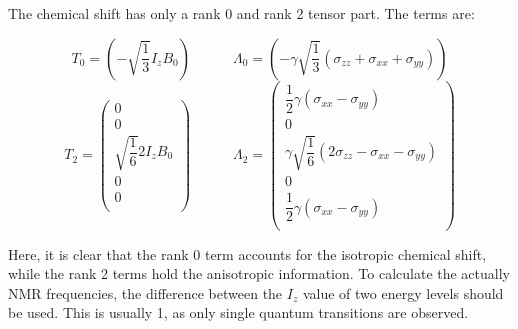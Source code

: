 \documentclass[11pt,a4paper]{article}
\begin{document}
The chemical shift has only a rank 0 and rank 2 tensor part. The terms are:

\begin{equation}
  T_{0} = \left( - \sqrt{\frac{1}{3}} I_z B_0 \right)
  \quad\quad\quad
\Lambda_0 = \left( - \gamma \sqrt{\frac{1}{3}} (\sigma_{zz} + \sigma_{xx} + \sigma_{yy}) \right)
\end{equation}
\begin{equation}
  T_{2} = \left( \begin{array}{c}
0 \\
0 \\
\sqrt{\dfrac{1}{6}} 2I_z B_0 \\
0 \\
0\\
  \end{array} \right)
  \quad\quad\quad
\Lambda_2 = \left( \begin{array}{c}
  \dfrac{1}{2} \gamma (\sigma_{xx} - \sigma_{yy})\\
  0\\
  \gamma \sqrt{\dfrac{1}{6}} (2\sigma_{zz} - \sigma_{xx} - \sigma_{yy})\\
  0\\
  \dfrac{1}{2} \gamma (\sigma_{xx} - \sigma_{yy})\\
  \end{array} \right)
\end{equation}

Here, it is clear that the rank 0 term accounts for the isotropic chemical shift, while the rank 2
terms hold the anisotropic information. To calculate the actually NMR frequencies, the difference
between the $I_z$ value of two energy levels should be used. This is usually 1, as only single
quantum transitions are observed.
\end{document}
